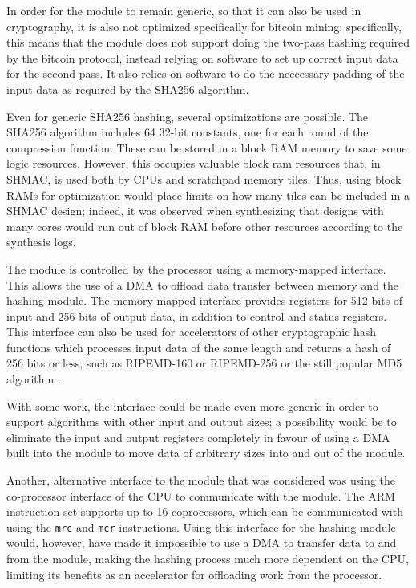 In order for the module to remain generic, so that it can also be used in cryptography, it
is also not optimized specifically for bitcoin mining; specifically, this means that the module
does not support doing the two-pass hashing required by the bitcoin protocol, instead relying
on software to set up correct input data for the second pass. It also relies on software to
do the neccessary padding of the input data as required by the SHA256 algorithm.

Even for generic SHA256 hashing, several optimizations are possible. The SHA256 algorithm
includes 64 32-bit constants, one for each round of the compression function. These can be
stored in a block RAM memory to save some logic resources. However, this occupies valuable
block ram resources that, in SHMAC, is used both by CPUs and scratchpad memory tiles. Thus,
using block RAMs for optimization would place limits on how many tiles can be included in
a SHMAC design; indeed, it was observed when synthesizing that designs with many cores
would run out of block RAM before other resources according to the synthesis logs.

The module is controlled by the processor using a memory-mapped interface. This allows the use
of a DMA to offload data transfer between memory and the hashing module. The memory-mapped interface
provides registers for 512 bits of input and 256 bits of output data, in addition to control and
status registers. This interface can also be used for accelerators of other cryptographic hash
functions which processes input data of the same length and returns a hash of 256 bits or less,
such as RIPEMD-160 or RIPEMD-256 \cite{ripemd} or the still popular MD5 algorithm \cite{md5}.

With some work, the interface could be made even more generic in order to support algorithms
with other input and output sizes; a possibility would be to eliminate the input and output
registers completely in favour of using a DMA built into the module to move data of arbitrary
sizes into and out of the module.

Another, alternative interface to the module that was considered was using the co-processor interface
of the CPU to communicate with the module. The ARM instruction set supports up to 16 coprocessors,
which can be communicated with using the \texttt{mrc} and \texttt{mcr} instructions. Using this
interface for the hashing module would, however, have made it impossible to use a DMA to transfer
data to and from the module, making the hashing process much more dependent on the CPU, limiting
its benefits as an accelerator for offloading work from the processor.

